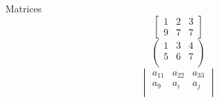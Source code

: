 \documentclass[a4paper,10pt]{article}
\begin{document}
Matrices
\begin{equation}
\begin{bmatrix}
1 & 2 & 3 \\
9& 7 & 7
\end{bmatrix}
\end{equation}
\begin{equation}
\begin{pmatrix}
1 & 3 & 4 \\
5 & 6 & 7 \\
\end{pmatrix}
\end{equation}
\begin{equation}
\begin{vmatrix}
a_{11} & a_{22} & a_{33} \\
a_9 & a_i & a_j \\
\end{vmatrix}
\end{equation}
\end{document}
